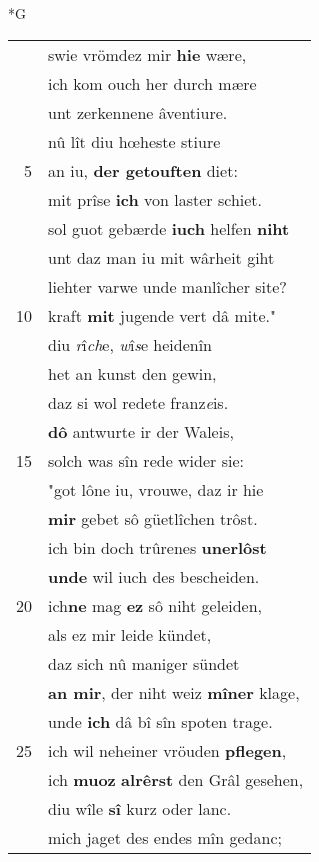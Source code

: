 \documentclass[8pt,a4paper,notitlepage]{article}
\begin{document}
\begin{table}[ht]
\begin{minipage}[t]{0.5\linewidth}
\small
\begin{center}*G
\end{center}
\begin{tabular}{rl}
 & swie vrömdez mir \textbf{hie} wære,\\ 
 & ich kom ouch her durch mære\\ 
 & unt zerkennene âventiure.\\ 
 & nû lît diu hœheste stiure\\ 
5 & an iu, \textbf{der getouften} diet:\\ 
 & mit prîse \textbf{ich} von laster schiet.\\ 
 & sol guot gebærde \textbf{iuch} helfen \textbf{niht}\\ 
 & unt daz man iu mit wârheit giht\\ 
 & liehter varwe unde manlîcher site?\\ 
10 & kraft \textbf{mit} jugende vert dâ mite."\\ 
 & diu \textit{r}î\textit{ch}e, \textit{w}î\textit{s}e heidenîn\\ 
 & het an kunst den gewin,\\ 
 & daz si wol redete franz\textit{e}is.\\ 
 & \textbf{dô} antwurte ir der Waleis,\\ 
15 & solch was sîn rede wider sie:\\ 
 & "got lône iu, vrouwe, daz ir hie\\ 
 & \textbf{mir} gebet sô güetlîchen trôst.\\ 
 & ich bin doch trûrenes \textbf{unerlôst}\\ 
 & \textbf{unde} wil iuch des bescheiden.\\ 
20 & ich\textbf{ne} mag \textbf{ez} sô niht geleiden,\\ 
 & als ez mir leide kündet,\\ 
 & daz sich nû maniger sündet\\ 
 & \textbf{an mir}, der niht weiz \textbf{mîner} klage,\\ 
 & unde \textbf{ich} dâ bî sîn spoten trage.\\ 
25 & ich wil neheiner vröuden \textbf{pflegen},\\ 
 & ich \textbf{muoz} \textbf{alrêrst} den Grâl gesehen,\\ 
 & diu wîle \textbf{sî} kurz oder lanc.\\ 
 & mich jaget des endes mîn gedanc;\\ 

\end{tabular}
\end{minipage}
\end{table}
\end{document}
